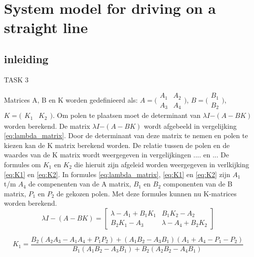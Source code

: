 \documentclass[11pt,titlepage]{report}
\begin{document}
\chapter{System model for driving on a straight line}

\section{inleiding}

TASK 3

Matrices A, B en K worden gedefinieerd als: $A = \bigl(\begin{smallmatrix}
  A_{1} & A_{2} \\
  A_{3} & A_{4}  
\end{smallmatrix} \bigr)$,  $B = \bigl(\begin{smallmatrix}
   B_{1}   \\
   B_{2}  
\end{smallmatrix} \bigr)$,
$ K = \bigl(\begin{smallmatrix}
    K_{1} & K_{2} 
\end{smallmatrix} \bigr)$.
Om polen te plaatsen moet de determinant van  $\lambda$$I$$-(A-BK)$ worden berekend. De matrix $\lambda$$I$$-(A-BK)$ wordt afgebeeld in vergelijking \eqref{eq:lambda_matrix}. Door de determinant van deze matrix te nemen en polen te kiezen kan de K matrix berekend worden. De relatie tussen de polen en de waardes van de K matrix wordt weergegeven in vergelijkingen .... en ... De formules om  $K_{1}$ en $K_{2}$ die hieruit zijn afgeleid worden weergegeven in verlkijking \eqref{eq:K1} en \eqref{eq:K2}. In formules \eqref{eq:lambda_matrix}, \eqref{eq:K1} en \eqref{eq:K2} zijn $A_{1}$ t/m $A_{4}$ de compenenten van de A matrix, $B_{1}$ en $B_{2}$ componenten van de B matrix, $P_{1}$ en $P_{2}$ de gekozen polen.
Met deze formules kunnen nu K-matrices worden berekend. \\ 

\begin{equation} \label{eq:lambda_matrix}
{\lambda}I-(A-BK) =
 \begin{bmatrix}
  {\lambda} - A_{1} + B_{1}K_{1} & B_{1}K_{2} - A_{2} \\
  B_{2}K_{1} - A_{3} & \lambda - A_{4} + B_{2}K_{2}  
 \end{bmatrix}
\end{equation}


\begin{equation} \label{eq:K1}
K_{1} = \frac{B_{2}(A_{2}A_{3} - A_{1}A_{4} + P_{1}P_{2}) + (A_{1}B_{2} - A_{3}B_{1})(A_{1} + A_{4} - P_{1} - P_{2})}{B_{1}(A_{1}B_{2} - A_{3}B_{1}) + B_{2}(A_{2}B_{2} - A_{4}B_{1})}
\end{equation}
\end{document}
